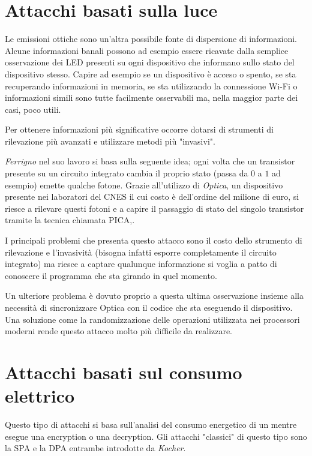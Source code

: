 	\section{Attacchi basati sulla luce}
		Le emissioni ottiche sono un'altra possibile fonte di dispersione di informazioni. Alcune informazioni banali possono ad esempio essere ricavate dalla semplice osservazione dei \acs{LED} presenti su ogni dispositivo che informano sullo stato del dispositivo stesso. Capire ad esempio se un dispositivo è acceso o spento, se sta recuperando informazioni in memoria, se sta utilizzando la connessione Wi-Fi o informazioni simili sono tutte facilmente osservabili ma, nella maggior parte dei casi, poco utili.
		
		Per ottenere informazioni più significative occorre dotarsi di strumenti di rilevazione più avanzati e utilizzare metodi più "invasivi".
		
		\emph{Ferrigno} nel suo lavoro\cite{ferrigno2008aes} si basa sulla seguente idea; ogni volta che un transistor presente su un circuito integrato cambia il proprio stato (passa da $0$ a $1$ ad esempio) emette qualche fotone. Grazie all'utilizzo di \emph{Optica}, un dispositivo presente nei laboratori del \ac{CNES} il cui costo è dell'ordine del milione di euro, si riesce a rilevare questi fotoni e a capire il passaggio di stato del singolo transistor tramite la tecnica chiamata \ac{PICA}\cite{tsang2000picosecond},.
		
		I principali problemi che presenta questo attacco sono il costo dello strumento di rilevazione e l'invasività (bisogna infatti esporre completamente il circuito integrato) ma riesce a captare qualunque informazione si voglia a patto di conoscere il programma che sta girando in quel momento.
		
		Un ulteriore problema è dovuto proprio a questa ultima osservazione insieme alla necessità di sincronizzare Optica con il codice che sta eseguendo il dispositivo. Una soluzione come la randomizzazione delle operazioni utilizzata nei processori moderni rende questo attacco molto più difficile da realizzare.
			
	\section{Attacchi basati sul consumo elettrico}
		Questo tipo di attacchi si basa sull'analisi del consumo energetico di un \disps mentre esegue una encryption o una decryption. Gli attacchi "classici" di questo tipo sono la \ac{SPA} e la \ac{DPA} entrambe introdotte da \emph{Kocher}\cite{kocher2011introduction}.
		
